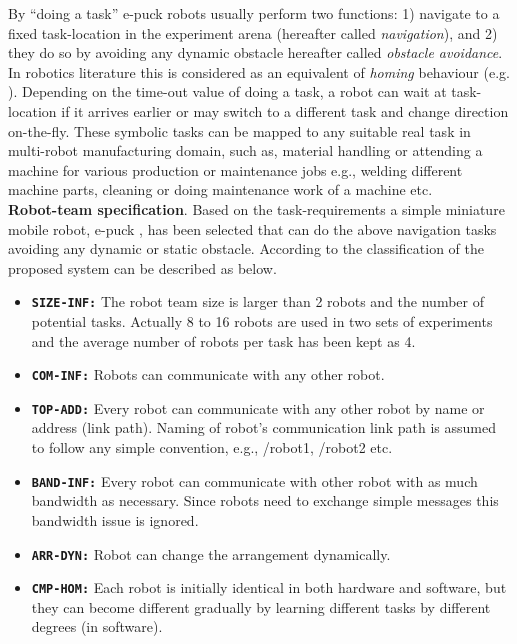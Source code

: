 By ``doing a task'' e-puck robots usually perform two functions: 1) navigate to a fixed task-location in the experiment arena (hereafter called {\em navigation}), and 2) they do so by avoiding any dynamic obstacle {hereafter called {\em obstacle avoidance}}. In robotics literature this is considered as an equivalent of {\em homing} behaviour (e.g. ). Depending on the time-out value of doing a task, a robot can wait at task-location if it arrives earlier or may switch to a different task and change direction on-the-fly. These symbolic tasks can be mapped to any suitable real task in multi-robot manufacturing domain, such as, material handling or attending a machine for various production or maintenance jobs e.g., welding different machine parts, cleaning or doing maintenance work of a machine etc.\\
\textbf{Robot-team specification}. Based on the task-requirements a simple miniature mobile robot, e-puck \cite{Mondada+2009},  has been selected that can do the above navigation tasks avoiding any dynamic or static obstacle. According to the classification of  the proposed system can be described as below.
\begin{itemize}
\item \texttt{\textbf{SIZE-INF:}} The robot team size is larger than 2 robots and the number of potential tasks. Actually   8 to 16 robots are used in two sets of experiments and  the average number of robots per task has been kept as 4.
\item \texttt{\textbf{COM-INF:}} Robots can communicate with any other robot.
\item \texttt{\textbf{TOP-ADD:}} Every robot can communicate with any other robot by name or address (link path). Naming of robot's communication link path is assumed to follow any simple convention, e.g., /robot1, /robot2 etc.
\item \texttt{\textbf{BAND-INF:}} Every robot can communicate with other robot with as much bandwidth as necessary. Since  robots need to exchange simple messages this bandwidth issue is ignored.
\item \texttt{\textbf{ARR-DYN:}} Robot can change the arrangement dynamically.
\item \texttt{\textbf{CMP-HOM:}} Each robot is initially identical in both hardware and software, but they can become different gradually by learning different tasks by different degrees (in software).
\end{itemize}
